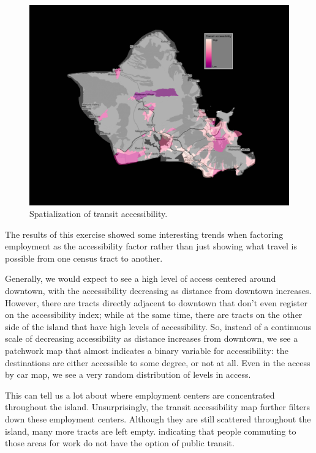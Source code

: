 \documentclass[
]{article}
\begin{document}
\begin{figure}

{\centering \includegraphics[width=1\linewidth]{transit_access} 

}

\caption{Spatialization of transit accessibility.}\label{fig:figurename7}
\end{figure}

The results of this exercise showed some interesting trends when
factoring employment as the accessibility factor rather than just
showing what travel is possible from one census tract to another.

Generally, we would expect to see a high level of access centered around
downtown, with the accessibility decreasing as distance from downtown
increases. However, there are tracts directly adjacent to downtown that
don't even register on the accessibility index; while at the same time,
there are tracts on the other side of the island that have high levels
of accessibility. So, instead of a continuous scale of decreasing
accessibility as distance increases from downtown, we see a patchwork
map that almost indicates a binary variable for accessibility: the
destinations are either accessible to some degree, or not at all. Even
in the access by car map, we see a very random distribution of levels in
access.

This can tell us a lot about where employment centers are concentrated
throughout the island. Unsurprisingly, the transit accessibility map
further filters down these employment centers. Although they are still
scattered throughout the island, many more tracts are left empty.
indicating that people commuting to those areas for work do not have the
option of public transit.
\end{document}

